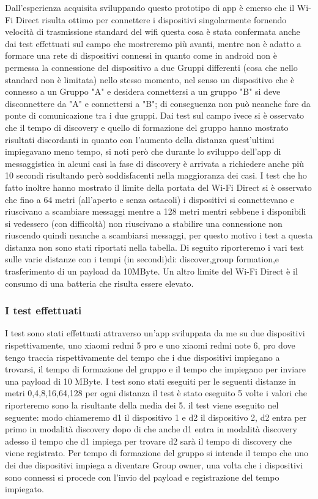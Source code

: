 Dall'esperienza acquisita sviluppando questo prototipo di app è emerso
che il Wi-Fi Direct risulta ottimo per connettere i dispositivi singolarmente
fornendo velocità di trasmissione standard del wifi questa cosa è stata confermata
anche dai test effettuati sul campo che mostreremo più avanti,
mentre non è adatto a formare una rete di dispositivi connessi in quanto
come in android non è permessa la connessione  
del dispositivo a due Gruppi differenti (cosa che nello standard non è limitata) 
nello stesso momento,
nel senso un dispositivo che è connesso a un Gruppo "A" 
e desidera connettersi a un gruppo "B"  si deve disconnettere da "A" e connettersi a "B";
di conseguenza non può neanche fare da ponte di comunicazione tra i due gruppi.
Dai test sul campo ivece si è osservato che il tempo di discovery e quello di formazione del gruppo
hanno mostrato risultati discordanti in quanto con l'aumento della distanza quest'ultimi
impiegavano meno tempo, si noti però che durante lo sviluppo dell'app di messaggistica
in alcuni casi la fase di discovery è arrivata a richiedere anche più 10 secondi risultando 
però soddisfacenti nella maggioranza dei casi.
I test che ho fatto inoltre hanno mostrato il limite della portata
del Wi-Fi Direct si è osservato che fino a 64 metri
(all'aperto e senza ostacoli) i dispositivi
si connettevano e riuscivano a scambiare messaggi  mentre a 128 metri
mentri sebbene i disponibili si vedessero (con difficoltà) non riuscivano
a stabilire una connessione non riuscendo quindi neanche a scambiarsi messaggi,
per questo motivo i test a questa distanza non sono stati riportati nella tabella.
Di seguito riporteremo i vari test sulle varie distanze con i tempi (in secondi)di:
discover,group formation,e trasferimento di un payload da 10MByte.
Un altro limite del Wi-Fi Direct è il consumo di una batteria che risulta
essere elevato.

\subsubsection{I test effettuati}

I test sono stati effettuati attraverso un'app sviluppata da me
su due dispositivi rispettivamente,
uno xiaomi redmi 5 pro e uno xiaomi redmi note 6, pro dove tengo
traccia rispettivamente del tempo che i due dispositivi impiegano a
trovarsi, il tempo di formazione del gruppo e il tempo che impiegano
per inviare una payload di 10 MByte.
I test sono stati eseguiti per le seguenti distanze in metri 0,4,8,16,64,128
per ogni distanza il test è stato eseguito 5 volte
i valori che riporteremo sono la risultante della media dei 5.
il test viene eseguito nel seguente: modo chiameremo d1 il dispositivo 1
e d2 il dispositivo 2,
d2 entra per primo in modalità discovery dopo di che anche d1 entra in modalità
discovery adesso il tempo che d1 impiega per trovare d2 sarà il tempo
di discovery che viene registrato. Per tempo di formazione del
gruppo si intende il tempo che uno dei due dispositivi impiega a
diventare Group owner, una volta che i dispositivi sono connessi
si procede con l'invio del payload e registrazione del tempo impiegato.

